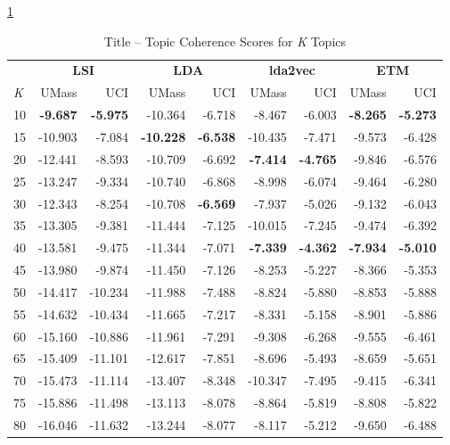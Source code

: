 \documentclass[letterpaper,12pt]{article}
\begin{document}
\ref{tab:combo_title_tc}
\begin{table}
	\caption{\label{tab:combo_title_tc} Title -- Topic Coherence Scores for \emph{K} Topics}
	\begin{center}
		\begin{tabular}{|l|rr|rr|rr|rr|}
			\hline
			{} & \multicolumn{2}{c|}{\textbf{LSI}} & \multicolumn{2}{c|}{\textbf{LDA}} & \multicolumn{2}{c|}{\textbf{lda2vec}} & \multicolumn{2}{c|}{\textbf{ETM}} \\
			\emph{K} &   UMass &     UCI &   UMass &    UCI &   UMass &    UCI &  UMass &    UCI \\
			\hline
			10  &  \textbf{-9.687} &  \textbf{-5.975} & -10.364 & -6.718 &  -8.467 & -6.003 & \textbf{-8.265} & \textbf{-5.273} \\
			15  & -10.903 &  -7.084 & \textbf{-10.228} & \textbf{-6.538} & -10.435 & -7.471 & -9.573 & -6.428 \\
			20  & -12.441 &  -8.593 & -10.709 & -6.692 & \textbf{-7.414} & \textbf{-4.765} & -9.846 & -6.576 \\
			25  & -13.247 &  -9.334 & -10.740 & -6.868 &  -8.998 & -6.074 & -9.464 & -6.280 \\
			30  & -12.343 &  -8.254 & -10.708 & \textbf{-6.569} &  -7.937 & -5.026 & -9.132 & -6.043 \\
			35  & -13.305 &  -9.381 & -11.444 & -7.125 & -10.015 & -7.245 & -9.474 & -6.392 \\
			40  & -13.581 &  -9.475 & -11.344 & -7.071 &  \textbf{-7.339} & \textbf{-4.362} & \textbf{-7.934} & \textbf{-5.010} \\
			45  & -13.980 &  -9.874 & -11.450 & -7.126 &  -8.253 & -5.227 & -8.366 & -5.353 \\
			50  & -14.417 & -10.234 & -11.988 & -7.488 &  -8.824 & -5.880 & -8.853 & -5.888 \\
			55  & -14.632 & -10.434 & -11.665 & -7.217 &  -8.331 & -5.158 & -8.901 & -5.886 \\
			60  & -15.160 & -10.886 & -11.961 & -7.291 &  -9.308 & -6.268 & -9.555 & -6.461 \\
			65  & -15.409 & -11.101 & -12.617 & -7.851 &  -8.696 & -5.493 & -8.659 & -5.651 \\
			70  & -15.473 & -11.114 & -13.407 & -8.348 & -10.347 & -7.495 & -9.415 & -6.341 \\
			75  & -15.886 & -11.498 & -13.113 & -8.078 &  -8.864 & -5.819 & -8.808 & -5.822 \\
			80  & -16.046 & -11.632 & -13.244 & -8.077 &  -8.117 & -5.212 & -9.650 & -6.488 \\

\end{tabular}
\end{center}
\end{table}
\end{document}
